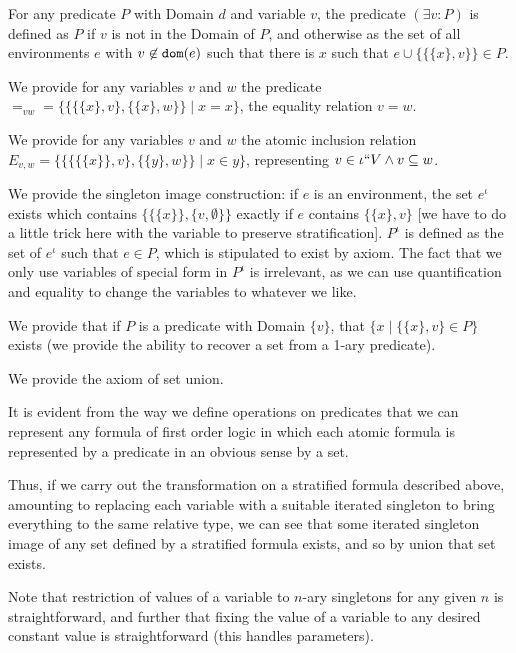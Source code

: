 \documentclass{slides}
\begin{document}
\begin{slide}

For any predicate $P$ with Domain $d$ and variable $v$, the predicate $(\exists v:P)$ is defined as $P$ if $v$ is not in the Domain of $P$,
and otherwise as the set of all environments $e$ with $v \not\in {\tt dom}(e)$ such that there is $x$ such that $e \cup \{\{\{x\},v\}\} \in P$.

We provide for any variables $v$ and $w$ the predicate $=_{vw} = \{\{\{\{x\},v\},\{\{x\},w\}\}\mid x=x\}$, the equality relation $v = w$.

We provide for any variables $v$ and $w$ the atomic inclusion relation $E_{v,w} = \{\{\{\{\{x\}\},v\},\{\{y\},w\}\}\mid x\in y\}$, representing
$v \in \iota``V \wedge v \subseteq w$.

\end{slide}

\begin{slide}

We provide the singleton image construction:  if $e$ is an environment, the set $e^\iota$ exists which contains $\{\{\{x\}\},\{v,\emptyset\}\}$
exactly if $e$ contains $\{\{x\},v\}$ [we have to do a little trick here with the variable to preserve stratification].  $P^\iota$ is defined as the set of $e^\iota$ such that $e \in P$, which is stipulated to exist by axiom.  The fact that we only use variables of special form in $P^\iota$ is irrelevant, as we can use quantification and equality to change the variables to whatever we like.

We provide that if $P$ is a predicate with Domain $\{v\}$, that $\{x\mid \{\{x\},v\} \in P\}$ exists (we provide the ability to recover
a set from a 1-ary predicate).

We provide the axiom of set union.

\end{slide}

\begin{slide}

It is evident from the way we define operations on predicates that we can represent any formula of first order logic in which each
atomic formula is represented by a predicate in an obvious sense by a set.

Thus, if we carry out the transformation on a stratified formula described above, amounting to replacing each variable with a suitable iterated singleton to bring everything to the same relative type, we can see that some iterated singleton image of any set defined by a stratified formula exists, and so by union that set exists.

Note that  restriction of values of a variable to $n$-ary singletons for any given $n$ is straightforward, and further that fixing the
value of a variable to any desired constant value is straightforward (this handles parameters).

\end{slide}
\end{document}
